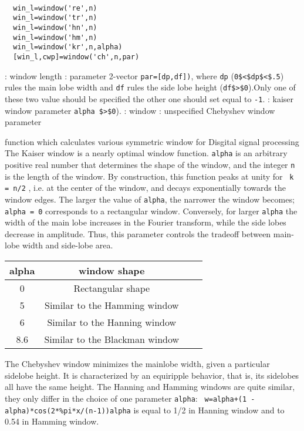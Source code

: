 \begin{mandesc}
   \\ %
\end{mandesc}
\begin{calling_sequence}
\begin{verbatim}
  win_l=window('re',n)
  win_l=window('tr',n)
  win_l=window('hn',n)
  win_l=window('hm',n)
  win_l=window('kr',n,alpha)
  [win_l,cwp]=window('ch',n,par)
\end{verbatim}
\end{calling_sequence}
\begin{parameters}
  \begin{varlist}
    : window length
    : parameter 2-vector \verb!par=[dp,df])!, where
    \verb!dp!  (\verb!0$<$dp$<$.5!) rules the  main lobe
    width and  \verb!df! rules the side lobe height
    (\verb!df$>$0!).Only one of these two value should be specified the other one
    should set equal to \verb!-1!.
    : kaiser window parameter \verb!alpha $>$0!). 
    : window
    : unspecified Chebyshev window parameter
  \end{varlist}
\end{parameters}
\begin{mandescription}
  function which calculates various symmetric window for Disgital signal processing
  The Kaiser window is a nearly optimal window function. \verb!alpha!
  is an arbitrary positive real number that determines the shape of the
  window,  and the integer  \verb!n! is the length of the window.
  By construction, this function peaks at unity for \verb! k = n/2! ,
  i.e. at the center of the window, and decays exponentially towards the 
  window edges.   The larger the value of \verb!alpha!, the narrower 
  the window becomes; \verb!alpha = 0! corresponds to a rectangular window.
  Conversely, for larger \verb!alpha! the width of the main lobe
  increases in the Fourier transform, while the side lobes decrease in
  amplitude. 
  Thus, this parameter controls the tradeoff between main-lobe width and
  side-lobe area.
  \begin{tabular}{|c|c|c|c|}\hline 
    alpha & window shape \\ \hline
    0 & Rectangular shape \\ \hline
    5 & Similar to the Hamming window \\ \hline
    6 & Similar to the Hanning window \\ \hline
    8.6 & Similar to the Blackman window \\ \hline
  \end{tabular}
  The Chebyshev window minimizes the mainlobe width, given a particular sidelobe
  height. It is characterized by an equiripple behavior, that is, its
  sidelobes all have the same height.
  The Hanning and Hamming windows are quite similar, they only differ in
  the choice of one parameter \verb!alpha!: 
  \verb! w=alpha+(1 - alpha)*cos(2*%pi*x/(n-1))!\verb!alpha! is equal to 1/2 in Hanning window and to 0.54 in
  Hamming window.
\end{mandescription}

